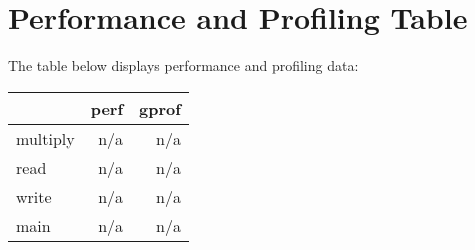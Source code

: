 \documentclass{article}
\begin{document}
\section*{Performance and Profiling Table}
The table below displays performance and profiling data:

\begin{tabular}{lrr}
\hline
       & perf   & gprof  \\
\hline
multiply & n/a    & n/a    \\
read     & n/a    & n/a    \\
write    & n/a    & n/a    \\
main     & n/a    & n/a    \\
\hline
\end{tabular}
\end{document}
